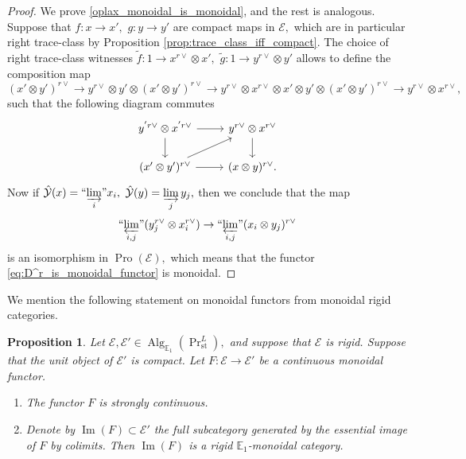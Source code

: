 \documentclass[11pt,leqno]{amsart}
\newtheorem{prop}[theo]{Proposition}
\numberwithin{equation}{section}
\def\wt{\widetilde}
\newcommand{\indlim}[1][]{\mathop{\varinjlim}\limits_{#1}}
\newcommand{\inddlim}[1][]{{``{\indlim[#1]}"}}
\newcommand{\prolim}[1][]{\mathop{\varprojlim}\limits_{#1}}
\newcommand{\proolim}[1][]{{``{\prolim[#1]}"}}
\newcommand{\st}{\operatorname{st}}
\newcommand{\bE}{{\mathbb E}}
\newcommand{\cE}{{\mathcal E}}
\newcommand{\cY}{{\mathcal Y}}
\newcommand{\im}{\operatorname{Im}}
\newcommand{\Pro}{\operatorname{Pro}}
\newcommand{\Alg}{\operatorname{Alg}}
\begin{document}
\begin{proof}
We prove \ref{oplax_monoidal_is_monoidal}, and the rest is analogous. Suppose that $f:x\to x',$ $g:y\to y'$ are compact maps in $\cE,$ which are in particular right trace-class by Proposition \ref{prop:trace_class_iff_compact}. The choice of right trace-class witnesses $\wt{f}:1\to x^{r\vee}\otimes x',$ $\wt{g}:1\to y^{r\vee}\otimes y'$ allows to define the composition map 
\begin{equation*}
(x'\otimes y')^{r\vee}\to y^{r\vee}\otimes y'\otimes (x'\otimes y')^{r\vee}\to y^{r\vee}\otimes x^{r\vee}\otimes x'\otimes y'\otimes (x'\otimes y')^{r\vee}\to y^{r\vee}\otimes x^{r\vee},  
\end{equation*}
such that the following diagram commutes
\begin{equation*}
\begin{tikzcd}
y^{'r\vee}\otimes x^{'r\vee}\ar[r]\ar[d] & y^{r\vee}\otimes x^{r\vee}\ar[d]\\
(x'\otimes y')^{r\vee}\ar[r]\ar[ru] & (x\otimes y)^{r\vee}.
\end{tikzcd}
\end{equation*}
Now if $\hat{\cY}(x)=\inddlim[i] x_i,$ $\hat{\cY}(y)=\indlim[j]y_j,$ then we conclude that the map
\begin{equation*}
\proolim[i,j](y_j^{r\vee}\otimes x_i^{r\vee})\to \proolim[i,j](x_i\otimes y_j)^{r\vee}
\end{equation*}
is an isomorphism in $\Pro(\cE),$ which means that the functor \eqref{eq:D^r_is_monoidal_functor} is monoidal.
\end{proof}

We mention the following statement on monoidal functors from monoidal rigid categories.

\begin{prop}
Let $\cE,\cE'\in\Alg_{\bE_1}(\Pr^L_{\st}),$ and suppose that $\cE$ is rigid. Suppose that the unit object of $\cE'$ is compact. Let $F:\cE\to\cE'$ be a continuous monoidal functor.
\begin{enumerate}[label=(\roman*),ref=(\roman*)]
\item The functor $F$ is strongly continuous. \label{strcont}
\item Denote by $\im(F)\subset \cE'$ the full subcategory generated by the essential image of $F$ by colimits. Then $\im(F)$ is a rigid $\bE_1$-monoidal category. \label{image_is_rigid}
\end{enumerate}
\end{prop}
\end{document}
